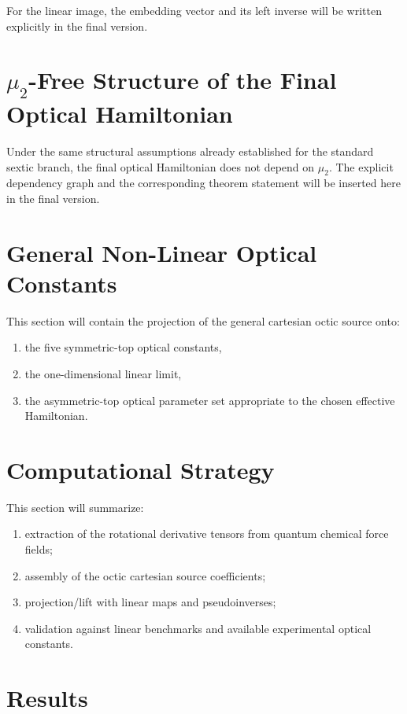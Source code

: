 \documentclass[aip,jcp,reprint,floatfix]{revtex4-2}
\begin{document}
For the linear image, the embedding vector and its left inverse will be written
explicitly in the final version.

\section{\texorpdfstring{$\mu_2$}{mu2}-Free Structure of the Final Optical Hamiltonian}

Under the same structural assumptions already established for the standard
sextic branch, the final optical Hamiltonian does not depend on \(\mu_2\). The
explicit dependency graph and the corresponding theorem statement will be
inserted here in the final version.

\section{General Non-Linear Optical Constants}

This section will contain the projection of the general cartesian octic source
onto:
\begin{enumerate}
\item the five symmetric-top optical constants,
\item the one-dimensional linear limit,
\item the asymmetric-top optical parameter set appropriate to the chosen
effective Hamiltonian.
\end{enumerate}

\section{Computational Strategy}

This section will summarize:
\begin{enumerate}
\item extraction of the rotational derivative tensors from quantum chemical
force fields;
\item assembly of the octic cartesian source coefficients;
\item projection/lift with linear maps and pseudoinverses;
\item validation against linear benchmarks and available experimental optical
constants.
\end{enumerate}

\section{Results}
\end{document}
